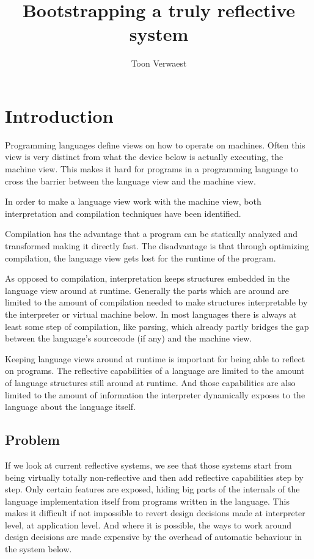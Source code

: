 \documentclass{article}
\title{Bootstrapping a truly reflective system}
\author{Toon Verwaest}
\begin{document}
\maketitle

\section{Introduction}

Programming languages define views on how to operate on machines.
Often this view is very distinct from what the device below is
actually executing, \ie the machine view. This makes it hard for
programs in a programming language to cross the barrier between
the language view and the machine view.

In order to make a language view work with the machine view, both
interpretation and compilation techniques have been identified.

Compilation has the advantage that a program can be statically
analyzed and transformed making it directly fast. The disadvantage is
that through optimizing compilation, the language view gets lost for
the runtime of the program. 

As opposed to compilation, interpretation keeps structures embedded in
the language view around at runtime. Generally the parts which are
around are limited to the amount of compilation needed to make
structures interpretable by the interpreter or virtual machine below.
In most languages there is always at least some step of compilation,
like parsing, which already partly bridges the gap between the
language's sourcecode (if any) and the machine view.

Keeping language views around at runtime is important for being able
to reflect on programs. The reflective capabilities of a language
are limited to the amount of language structures still around at
runtime. And those capabilities are also limited to the amount of
information the interpreter dynamically exposes to the language
about the language itself.

\subsection{Problem}
If we look at current reflective systems, we see that those systems
start from being virtually totally non-reflective and then add
reflective capabilities step by step. Only certain features are
exposed, hiding big parts of the internals of the language
implementation itself from programs written in the language. This
makes it difficult if not impossible to revert design decisions made
at interpreter level, at application level. And where it is possible,
the ways to work around design decisions are made expensive by the
overhead of automatic behaviour in the system below.
\end{document}
